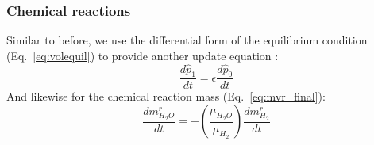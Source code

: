 \subsubsection{Chemical reactions}
Similar to before, we use the differential form of the equilibrium condition (Eq.~\ref{eq:volequil}) to provide another update equation :
\begin{equation}
\frac{d\hat{p}_1}{dt} = \epsilon \frac{d\hat{p}_0}{dt}
\end{equation}
And likewise for the chemical reaction mass (Eq.~\ref{eq:mvr_final}):
\begin{equation}
\frac{dm_{H_2O}^r}{dt} = - \left( \frac{\mu_{H_2O}}{\mu_{H_2}} \right) \frac{dm_{H_2}^r}{dt}
\label{eq:mvr_final}
\end{equation}
%
